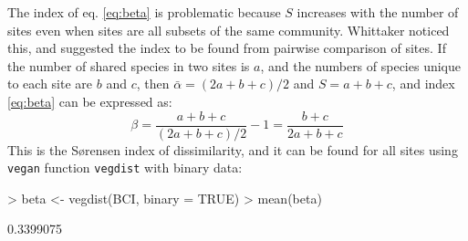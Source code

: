 \documentclass[a4paper,10pt]{amsart}
\begin{document}
The index of eq. \ref{eq:beta} is problematic because $S$ increases
with the number of sites even when sites are all subsets of the same
community.  Whittaker noticed this, and suggested the index to be
found from pairwise comparison of sites. If the number of shared
species in two sites is $a$, and the numbers of species unique to each
site are $b$ and $c$, then $\bar \alpha = (2a + b + c)/2$ and $S =
a+b+c$, and index \ref{eq:beta} can be expressed as:
\begin{equation}
  \label{eq:betabray}
  \beta = \frac{a+b+c}{(2a+b+c)/2} - 1 = \frac{b+c}{2a+b+c}
\end{equation}
This is the S{\o}rensen index of dissimilarity, and it can be found
for all sites using \texttt{vegan} function \texttt{vegdist} with
binary data:
\begin{Schunk}
\begin{Sinput}
> beta <- vegdist(BCI, binary = TRUE)
> mean(beta)
\end{Sinput}
\begin{Soutput}
[1] 0.3399075
\end{Soutput}
\end{Schunk}
\end{document}
